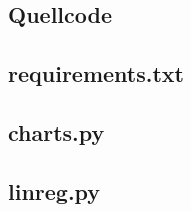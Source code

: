 \documentclass[
	11pt,
	a4paper,
	oneside,
	cleardoubleempty, 
	idxtotoc,
	english,
	openright
	final,
	listof=nochaptergap,
	]{scrbook}
\begin{document}


\let\chaptermark\oldchaptermark

\begin{appendices}
\chapter{Quellcode}

\section{requirements.txt}


\section{charts.py}


\section{linreg.py}


\end{appendices}
\end{document}
